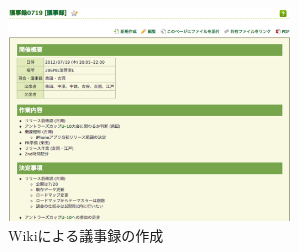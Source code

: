 \documentclass[submit,techreq,noauthor]{ipsj}
\begin{document}
\begin{figure}[t]
\includegraphics[width=7.5cm]{./figure/Wiki1.eps}
\caption{Wikiによる議事録の作成}
\label{fig:Wiki1}
\end{figure}

\end{document}
